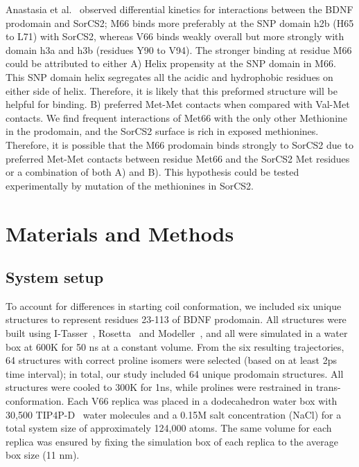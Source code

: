 \documentclass[10pt,letterpaper]{article}
\begin{document}
Anastasia et al.~\cite{Anastasia2013} observed differential kinetics for interactions between the BDNF prodomain and SorCS2; M66 binds more preferably at the SNP domain h2b (H65 to L71) with SorCS2, whereas V66 binds weakly overall but more strongly with domain h3a and h3b (residues Y90 to V94). The stronger binding at residue M66 could be attributed to either A) Helix propensity at the SNP domain in M66. This SNP domain helix segregates all the acidic and hydrophobic residues on either side of helix. Therefore, it is likely that this preformed structure will be helpful for binding. B) preferred Met-Met contacts when compared with Val-Met contacts. We find frequent interactions of Met66 with the only other Methionine in the prodomain, and the SorCS2 surface is rich in exposed methionines\cite{Leloup2018}. Therefore, it is possible that the M66 prodomain binds strongly to SorCS2 due to preferred Met-Met contacts between residue Met66 and the SorCS2 Met residues or a combination of both A) and B). This hypothesis could be tested experimentally by mutation of the methionines in SorCS2.  

\section*{Materials and Methods}

\subsection*{System setup} To account for differences in starting coil conformation, we included six unique structures to represent residues 23-113 of BDNF prodomain. All structures were built using I-Tasser~\cite{Yang2014,Roy2010,Bioinformatics}, Rosetta~\cite{Kim2004} and Modeller~\cite{Sali1993a}, and all were simulated in a water box at 600K for 50 ns at a constant volume. From the six resulting trajectories, 64 structures with correct proline isomers were selected (based on at least 2ps time interval); in total, our study included 64 unique prodomain structures. All structures were cooled to 300K for 1ns, while prolines were restrained in trans-conformation. Each V66 replica was placed in a dodecahedron water box with 30,500 TIP4P-D~\cite{Piana2015} water molecules and a 0.15M salt concentration (NaCl) for a total system size of approximately 124,000 atoms. The same volume for each replica was ensured by fixing the simulation box of each replica to the average box size (11 nm).
\end{document}

